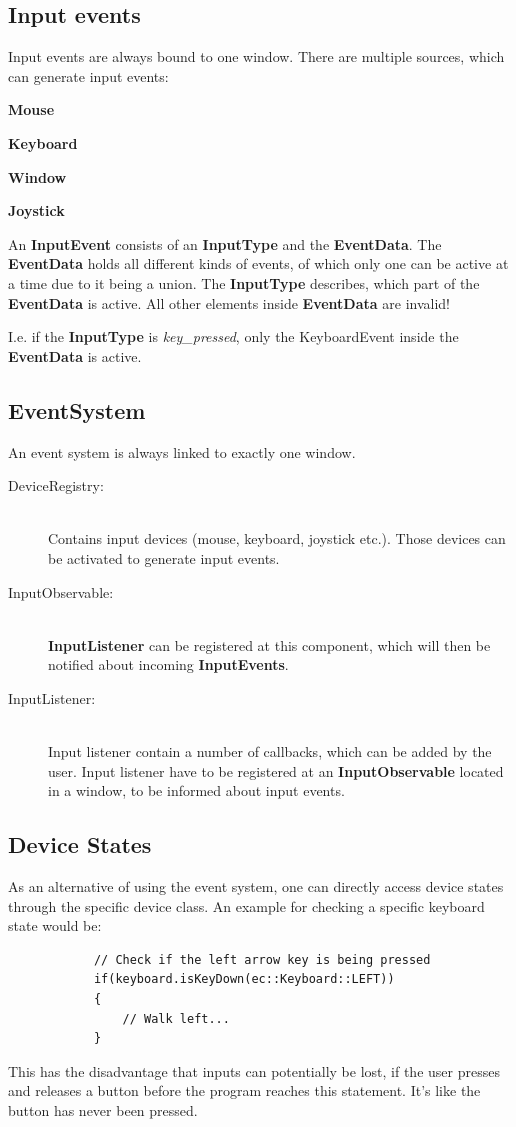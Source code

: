 \documentclass[12p, paper=a4, leqno, colorinlistoftodos]{article}
\newenvironment{packed_itemize}
{\begin{itemize}
		\setlength{\itemsep}{0pt}
		\setlength{\parskip}{0pt}
		\setlength{\parsep}{0pt}
	}{\end{itemize}}
\begin{document}
		\subsection{Input events}
		Input events are always bound to one window. There are multiple sources, which can generate input events:
		\begin{packed_itemize}
			\item \textbf{Mouse}
			\item \textbf{Keyboard}
			\item \textbf{Window}
			\item \textbf{Joystick}
		\end{packed_itemize}
		An \textbf{InputEvent} consists of an \textbf{InputType} and the \textbf{EventData}. The \textbf{EventData} holds all different kinds of events, of which only one can be active at a time due to it being a union. The \textbf{InputType} describes, which part of the \textbf{EventData} is active. All other elements inside \textbf{EventData} are invalid!
		
		I.e. if the \textbf{InputType} is \textit{key\_pressed}, only the KeyboardEvent inside the \textbf{EventData} is active.

		\subsection{EventSystem}
		An event system is always linked to exactly one window. 
		\begin{description}
			\item[DeviceRegistry:] \hfill\\
				Contains input devices (mouse, keyboard, joystick etc.). Those devices can be activated to generate input events.
			\item[InputObservable:] \hfill\\
				\textbf{InputListener} can be registered at this component, which will then be notified about incoming \textbf{InputEvents}.
			\item[InputListener:] \hfill\\
				Input listener contain a number of callbacks, which can be added by the user. Input listener have to be registered at an \textbf{InputObservable} located in a window, to be informed about input events.	
		\end{description}
	
		\subsection{Device States}
		As an alternative of using the event system, one can directly access device states through the specific device class. An example for checking a specific keyboard state would be:
		\begin{lstlisting}
			// Check if the left arrow key is being pressed
			if(keyboard.isKeyDown(ec::Keyboard::LEFT))
			{
				// Walk left...
			}
		\end{lstlisting}
		This has the disadvantage that inputs can potentially be lost, if the user presses and releases a button before the program reaches this statement. It's like the button has never been pressed.
		
\end{document}
